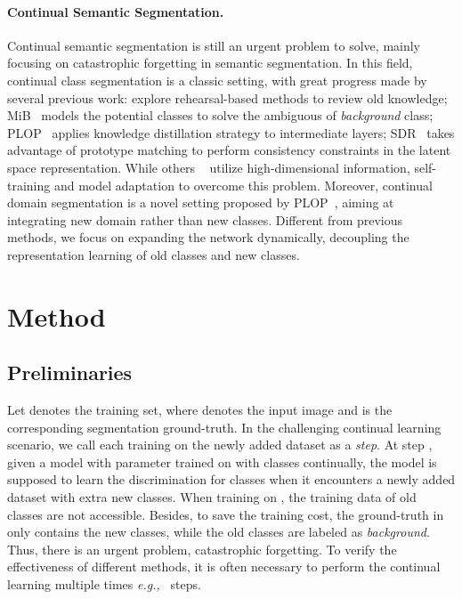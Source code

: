\documentclass[10pt,twocolumn,letterpaper]{article}
\newcommand{\myPara}[1]{\vspace{-.08in}\paragraph{#1}}
\def\eg{\emph{e.g.,~}}
\begin{document}
\myPara{Continual Semantic Segmentation.}
Continual semantic segmentation is still an urgent problem to solve, mainly focusing on
catastrophic forgetting\cite{kirkpatrick2017overcoming} in semantic segmentation.
In this field, continual class segmentation is a classic setting, with great progress made by several previous work: \cite{yan2021em,huang2021half} explore rehearsal-based methods to review old knowledge;
MiB~\cite{mib} models the potential classes to solve the ambiguous of \emph{background} class;
PLOP~\cite{plop} applies knowledge distillation strategy to intermediate layers;
SDR~\cite{sdr} takes advantage of prototype matching to perform consistency constraints in the latent space representation. While others ~\cite{stan2020unsupervised, frey2021continual, yu2020semantic} utilize high-dimensional information, self-training and model adaptation to overcome this problem.
Moreover, continual domain segmentation is a novel setting proposed by PLOP~\cite{plop}, aiming at integrating new domain rather than new classes.
Different from previous methods,
we focus on expanding the network dynamically,
decoupling the representation learning of old classes and new classes.





















\section{Method}
\subsection{Preliminaries} \label{sec:prelimi}
Let  denotes the training set,
where  denotes the input image and  is the corresponding segmentation ground-truth.
In the challenging continual learning scenario,
we call each training on the newly added dataset  as a \emph{step}.
At step ,
given a model  with parameter  trained on  with  classes continually, the model is supposed to learn the discrimination for  classes when it encounters a newly added dataset  with extra  new classes.
When training on , the training data of old classes are not accessible. Besides, to save the training cost, the ground-truth in  only contains the  new classes, while the old classes are labeled as \emph{background}.
Thus,
there is an urgent problem,
catastrophic forgetting.
To verify the effectiveness of different methods,
it is often necessary to perform the continual learning multiple times
\eg{ steps}.
\end{document}
